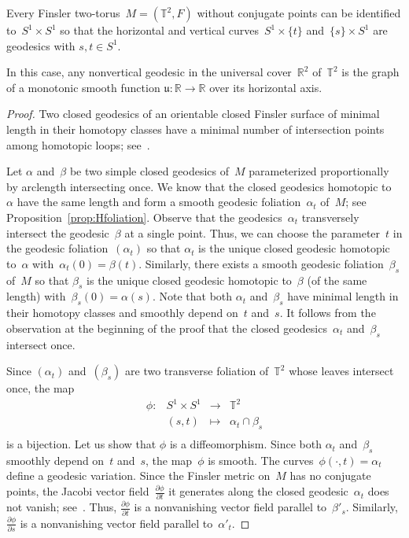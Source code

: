 \documentclass[AHL,Unicode,longabstracts,published]{cedram}
\newcommand{\R}{\mathbb{R}}
\newcommand{\T}{\mathbb{T}}
\newcommand{\bu}{\mathfrak{u}}
\begin{document}
\begin{prop}\label{prop:identification}
Every Finsler two-torus~$M=(\T^2,F)$ without conjugate points can be identified to~$S^1 \times S^1$ so that the horizontal and vertical curves~$S^1 \times \{t\}$ and~\mbox{$\{s\} \times S^1$} are geodesics with $s,t \in S^1$.

In this case, any nonvertical geodesic in the universal cover~$\R^2$ of~$\T^2$ is the graph of a monotonic smooth function $\bu:\R \to \R$ over its horizontal axis.
\end{prop}

\begin{proof}
Two closed geodesics of an orientable closed Finsler surface of minimal length in their homotopy classes have a minimal number of intersection points among homotopic loops; see~\cite{FHS82}.

Let $\alpha$ and~$\beta$ be two simple closed geodesics of~$M$ parameterized proportionally by arclength intersecting once. We know that the closed geodesics homotopic to~$\alpha$ have the same length and form a smooth geodesic foliation~$\alpha_t$ of~$M$; see Proposition~\ref{prop:Hfoliation}. Observe that the geodesics~$\alpha_t$ transversely intersect the geodesic~$\beta$ at a single point. Thus, we can choose the parameter~$t$ in the geodesic foliation~$(\alpha_t)$ so that $\alpha_t$ is the unique closed geodesic homotopic to~$\alpha$ with~$\alpha_t(0) = \beta(t)$. Similarly, there exists a smooth geodesic foliation~$\beta_s$ of~$M$ so that $\beta_s$ is the unique closed geodesic homotopic to~$\beta$ (of the same length) with~\mbox{$\beta_s(0)=\alpha(s)$}. Note that both $\alpha_t$ and~$\beta_s$ have minimal length in their homotopy classes and smoothly depend on~$t$ and~$s$. It follows from the observation at the beginning of the proof that the closed geodesics~$\alpha_t$ and~$\beta_s$ intersect once.


Since $(\alpha_t)$ and~$(\beta_s)$ are two transverse foliation of~$\T^2$ whose leaves intersect once, the map
\[
\begin{array}{rccc}
\phi : & S^{1}\times S^{1} & \to & \T^{2} \\
& (s,t) & \mapsto & \alpha_{t}\cap\beta_{s} \\
\end{array}
\]
is a bijection. Let us show that $\phi$ is a diffeomorphism. Since both $\alpha_t$ and~$\beta_s$ smoothly depend on~$t$ and~$s$, the map~$\phi$ is smooth. The curves~$\phi(\cdot,t)=\alpha_t$ define a geodesic variation. Since the Finsler metric on~$M$ has no conjugate points, the Jacobi vector field~$\frac{\partial \phi}{\partial t}$ it generates along the closed geodesic~$\alpha_t$ does not vanish; see~\cite[\S~5.4]{BCS}. Thus, $\frac{\partial \phi}{\partial t}$ is a nonvanishing vector field parallel to~$\beta'_s$. Similarly, $\frac{\partial \phi}{\partial s}$ is a nonvanishing vector field parallel to~$\alpha'_t$.


\end{proof}
\end{document}
